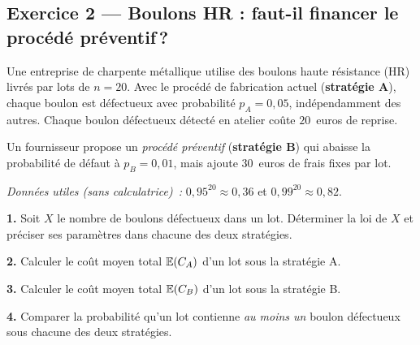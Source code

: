 \subsection*{Exercice 2 --- Boulons HR : faut-il financer le procédé préventif\,?}

Une entreprise de charpente métallique utilise des boulons haute résistance (HR) livrés par lots de $n = 20$. Avec le procédé de fabrication actuel (\textbf{stratégie A}), chaque boulon est défectueux avec probabilité $p_A = 0{,}05$, indépendamment des autres. Chaque boulon défectueux détecté en atelier coûte $20$~euros de reprise.

Un fournisseur propose un \emph{procédé préventif} (\textbf{stratégie B}) qui abaisse la probabilité de défaut à $p_B = 0{,}01$, mais ajoute $30$~euros de frais fixes par lot.

\medskip

\textit{Données utiles (sans calculatrice)~:} $0{,}95^{20} \approx 0{,}36$ \quad et \quad $0{,}99^{20} \approx 0{,}82$.

\textbf{1.} Soit $X$ le nombre de boulons défectueux dans un lot. Déterminer la loi de $X$ et préciser ses paramètres dans chacune des deux stratégies.

\textbf{2.} Calculer le coût moyen total $\mathbb{E}(C_A)$ d'un lot sous la stratégie A.

\textbf{3.} Calculer le coût moyen total $\mathbb{E}(C_B)$ d'un lot sous la stratégie B.

\textbf{4.} Comparer la probabilité qu'un lot contienne \emph{au moins un} boulon défectueux sous chacune des deux stratégies.

